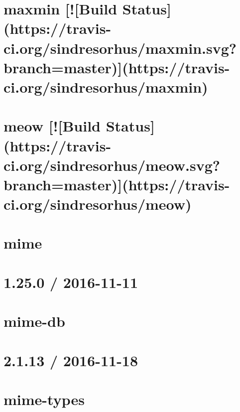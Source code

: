 \documentclass[twoside]{book}
\newcommand{\+}{\discretionary{\mbox{\scriptsize$\hookleftarrow$}}{}{}}
\begin{document}
\chapter{maxmin \mbox{[}!\mbox{[}Build Status\mbox{]}(https\+://travis-\/ci.org/sindresorhus/maxmin.svg?branch=master)\mbox{]}(https\+://travis-\/ci.org/sindresorhus/maxmin)}
\label{md_app_web_node_modules_maxmin_readme}

\chapter{meow \mbox{[}!\mbox{[}Build Status\mbox{]}(https\+://travis-\/ci.org/sindresorhus/meow.svg?branch=master)\mbox{]}(https\+://travis-\/ci.org/sindresorhus/meow)}
\label{md_app_web_node_modules_meow_readme}

\chapter{mime}
\label{md_app_web_node_modules_mime__r_e_a_d_m_e}

\chapter{1.25.0 / 2016-\/11-\/11}
\label{md_app_web_node_modules_mime-db__h_i_s_t_o_r_y}

\chapter{mime-\/db}
\label{md_app_web_node_modules_mime-db__r_e_a_d_m_e}

\chapter{2.1.13 / 2016-\/11-\/18}
\label{md_app_web_node_modules_mime-types__h_i_s_t_o_r_y}

\chapter{mime-\/types}
\label{md_app_web_node_modules_mime-types__r_e_a_d_m_e}

\end{document}

